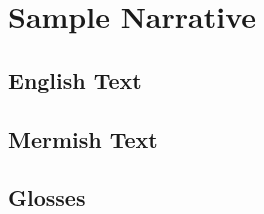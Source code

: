 \documentclass[11pt]{report}
\begin{document}
\chapter{Sample Narrative}
\section{English Text}


\section{Mermish Text}
\textipa{}

\section{Glosses}

\end{document}
